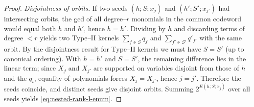 \documentclass[conference]{IEEEtran}
\theoremstyle{definition}
\DeclareMathOperator{\LTA}{LTA}
\newcommand{\wt}{\operatorname{wt}}
\newcommand{\ind}{\operatorname{ind}}
\begin{document}
\begin{proof}
\smallskip\noindent
\emph{Disjointness of orbits.}
If two seeds $(h;S;x_j)$ and $(h';S';x_{j'})$ had intersecting orbits,
the gcd of all degree–$r$ monomials in the common codeword would equal
both $h$ and $h'$, hence $h=h'$.  Dividing by $h$ and discarding terms
of degree $<r$ yields two Type–II kernels
$\sum_{f\in S}q_f$ and $\sum_{f'\in S'}q'_{f'}$ with the same orbit.
By the disjointness result for Type–II kernels
\cite[Prop.~4]{rowshan2025weight} we must have $S=S'$ (up to canonical
ordering).  With $h=h'$ and $S=S'$, the remaining difference lies in
the linear term; since $X_j$ and $X_{j'}$ are supported on variables
disjoint from those of $h$ and the $q_i$, equality of polynomials
forces $X_j=X_{j'}$, hence $j=j'$.  Therefore the seeds coincide, and
distinct seeds give disjoint orbits.  Summing $2^{E(h;S;x_j)}$ over all
seeds yields \eqref{eq:nested-rank-l-enum}.
\end{proof}









\end{document}
